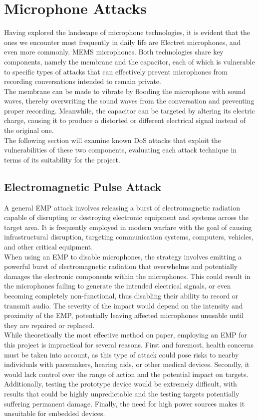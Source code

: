 \section{Microphone Attacks}
Having explored the landscape of microphone technologies, it is evident that the ones we encounter most frequently in daily life are Electret microphones, and even more commonly, MEMS microphones.
Both technologies share key components, namely the membrane and the capacitor, each of which is vulnerable to specific types of attacks that can effectively prevent microphones from recording conversations intended to remain private. \\
The membrane can be made to vibrate by flooding the microphone with sound waves, thereby overwriting the sound waves from the conversation and preventing proper recording.
Meanwhile, the capacitor can be targeted by altering its electric charge, causing it to produce a distorted or different electrical signal instead of the original one.\\
The following section will examine known DoS attacks that exploit the vulnerabilities of these two components, evaluating each attack technique in terms of its suitability for the project.
\subsection{Electromagnetic Pulse Attack}
A general EMP attack involves releasing a burst of electromagnetic radiation capable of disrupting or destroying electronic equipment and systems across the target area.
It is frequently employed in modern warfare with the goal of causing infrastructural disruption, targeting communication systems, computers, vehicles, and other critical equipment.\\
When using an EMP to disable microphones, the strategy involves emitting a powerful burst of electromagnetic radiation that overwhelms and potentially damages the electronic components within the microphones.
This could result in the microphones failing to generate the intended electrical signals, or even becoming completely non-functional, thus disabling their ability to record or transmit audio.
The severity of the impact would depend on the intensity and proximity of the EMP, potentially leaving affected microphones unusable until they are repaired or replaced.\\
While theoretically the most effective method on paper, employing an EMP for this project is impractical for several reasons.
First and foremost, health concerns must be taken into account, as this type of attack could pose risks to nearby individuals with pacemakers, hearing aids, or other medical devices.
Secondly, it would lack control over the range of action and the potential impact on targets.
Additionally, testing the prototype device would be extremely difficult, with results that could be highly unpredictable and the testing targets potentially suffering permanent damage.
Finally, the need for high power sources makes it unsuitable for embedded devices.
